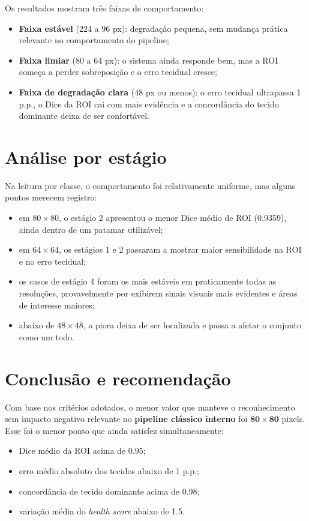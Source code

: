 \documentclass[
    12pt,
    openright,
    oneside,
    a4paper,
    chapter=TITLE,
    section=TITLE,
    brazil,
    sumario=tradicional,
    hidelinks
]{abntex2}
\begin{document}
Os resultados mostram três faixas de comportamento:
\begin{itemize}
    \item \textbf{Faixa estável} (\(224\) a \(96\) px): degradação pequena, sem mudança prática relevante no comportamento do pipeline;
    \item \textbf{Faixa limiar} (\(80\) a \(64\) px): o sistema ainda responde bem, mas a ROI começa a perder sobreposição e o erro tecidual cresce;
    \item \textbf{Faixa de degradação clara} (\(48\) px ou menos): o erro tecidual ultrapassa 1 p.p., o Dice da ROI cai com mais evidência e a concordância do tecido dominante deixa de ser confortável.
\end{itemize}

\section{Análise por estágio}
Na leitura por classe, o comportamento foi relativamente uniforme, mas alguns pontos merecem registro:
\begin{itemize}
    \item em \(80 \times 80\), o estágio 2 apresentou o menor Dice médio de ROI (0.9359), ainda dentro de um patamar utilizável;
    \item em \(64 \times 64\), os estágios 1 e 2 passaram a mostrar maior sensibilidade na ROI e no erro tecidual;
    \item os casos de estágio 4 foram os mais estáveis em praticamente todas as resoluções, provavelmente por exibirem sinais visuais mais evidentes e áreas de interesse maiores;
    \item abaixo de \(48 \times 48\), a piora deixa de ser localizada e passa a afetar o conjunto como um todo.
\end{itemize}

\section{Conclusão e recomendação}
Com base nos critérios adotados, o menor valor que manteve o reconhecimento sem impacto negativo relevante no \textbf{pipeline clássico interno} foi \(\mathbf{80 \times 80}\) pixels. Esse foi o menor ponto que ainda satisfez simultaneamente:
\begin{itemize}
    \item Dice médio da ROI acima de 0.95;
    \item erro médio absoluto dos tecidos abaixo de 1 p.p.;
    \item concordância de tecido dominante acima de 0.98;
    \item variação média do \textit{health score} abaixo de 1.5.
\end{itemize}
\end{document}

